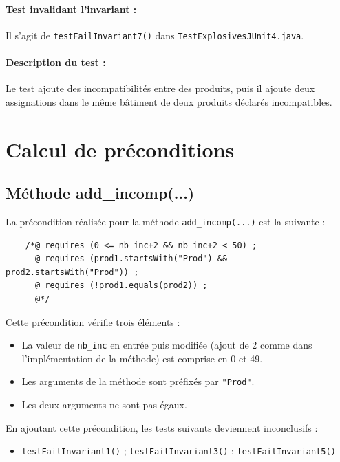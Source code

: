\documentclass{article}
\begin{document}
\vspace{-0.2cm}
\paragraph{Test invalidant l'invariant :} Il s'agit de \texttt{testFailInvariant7()} dans \texttt{TestExplosivesJUnit4.java}.

\vspace{-0.2cm}
\paragraph{Description du test :} Le test ajoute des incompatibilités entre des produits, puis il ajoute deux assignations dans le même bâtiment de deux produits déclarés incompatibles.

\newpage

\section{Calcul de préconditions}

\subsection{Méthode add\_incomp(...)}

\noindent
La précondition réalisée pour la méthode \texttt{add\_incomp(...)} est la suivante :
\vspace{0.3cm}

\noindent
\begin{verbatim}
    /*@ requires (0 <= nb_inc+2 && nb_inc+2 < 50) ;
      @ requires (prod1.startsWith("Prod") && prod2.startsWith("Prod")) ; 
      @ requires (!prod1.equals(prod2)) ;
      @*/
\end{verbatim}

\noindent
Cette précondition vérifie trois éléments :
\begin{itemize}
\item La valeur de \texttt{nb\_inc} en entrée puis modifiée (ajout de 2 comme dans l'implémentation de la méthode) est comprise en 0 et 49.
\item Les arguments de la méthode sont préfixés par \texttt{"Prod"}.
\item Les deux arguments ne sont pas égaux.
\end{itemize}

\vspace{0.3cm}
\noindent
En ajoutant cette précondition, les tests suivants deviennent inconclusifs :
\begin{itemize}
\renewcommand{\labelitemi}{$\rightarrow$} 
\item \texttt{testFailInvariant1()} ; \texttt{testFailInvariant3()} ; \texttt{testFailInvariant5()}
\end{itemize}
\end{document}
